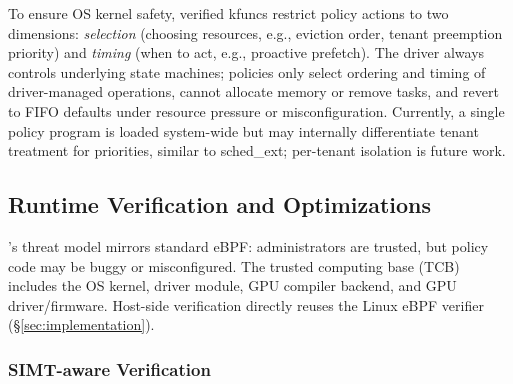 

To ensure OS kernel safety, verified kfuncs restrict policy actions to two dimensions: \emph{selection} (choosing resources, e.g., eviction order, tenant preemption priority) and \emph{timing} (when to act, e.g., proactive prefetch).
The driver always controls underlying state machines; policies only select ordering and timing of driver-managed operations, cannot allocate memory or remove tasks, and revert to FIFO defaults under resource pressure or misconfiguration.
Currently, a single policy program is loaded system-wide but may internally differentiate tenant treatment for priorities, similar to sched\_ext; per-tenant isolation is future work.

\subsection{Runtime Verification and Optimizations}
\label{sec:verification}

\sys{}'s threat model mirrors standard eBPF: administrators are trusted, but policy code may be buggy or misconfigured.
The trusted computing base (TCB) includes the OS kernel, \sys driver module, GPU compiler backend, and GPU driver/firmware.
Host-side verification directly reuses the Linux eBPF verifier (\S\ref{sec:implementation}).

\subsubsection{SIMT-aware Verification}

